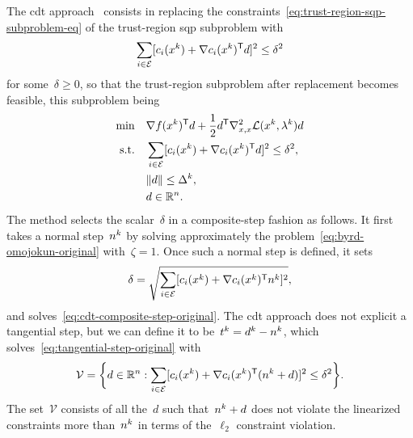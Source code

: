 The \gls{cdt} approach~\cite{Celis_1985,Celis_Dennis_Tapia_1985} consists in replacing the constraints~\cref{eq:trust-region-sqp-subproblem-eq} of the trust-region \gls{sqp} subproblem with
\begin{equation*}
    \sum_{i \in \ieq} [\con{i}(\iter[k]) + \nabla \con{i}(\iter[k])^{\T} \step]^2 \le \delta^2
\end{equation*}
for some~$\delta \ge 0$, so that the trust-region subproblem after replacement becomes feasible, this subproblem being
\begin{subequations}
    \label{eq:cdt-composite-step-original}
    \begin{align}
        \min        & \quad \nabla \obj(\iter[k])^{\T} \step + \frac{1}{2} \step^{\T} \nabla_{x, x}^2 \lag(\iter[k], \lm[k]) \step\\
        \text{s.t.} & \quad \sum_{i \in \ieq} [\con{i}(\iter[k]) + \nabla \con{i}(\iter[k])^{\T} \step]^2 \le \delta^2, \label{eq:cdt-composite-step-original-eq}\\
                    & \quad \norm{\step} \le \rad[k], \label{eq:cdt-composite-step-original-tr}\\
                    & \quad \step \in \R^n. \nonumber
    \end{align}
\end{subequations}
The method selects the scalar~$\delta$ in a composite-step fashion as follows.
It first takes a normal step~$\nstep[k]$ by solving approximately the problem~\cref{eq:byrd-omojokun-original} with~$\zeta = 1$.
Once such a normal step is defined, it sets
\begin{equation*}
    \delta = \sqrt{\sum_{i \in \ieq} [\con{i}(\iter[k]) + \nabla \con{i}(\iter[k])^{\T} \nstep[k]]^2},
\end{equation*}
and solves~\cref{eq:cdt-composite-step-original}.
The \gls{cdt} approach does not explicit a tangential step, but we can define it to be~$\tstep[k] = \step[k] - \nstep[k]$, which solves~\cref{eq:tangential-step-original} with
\begin{equation*}
    \mathcal{V} = \set[\bigg]{d \in \R^n : \sum_{i \in \ieq} [\con{i}(\iter[k]) + \nabla \con{i}(\iter[k])^{\T} (\nstep[k] + \step)]^2 \le \delta^2}.
\end{equation*}
The set~$\mathcal{V}$ consists of all the~$d$ such that~$\nstep[k] + d$ does not violate the linearized constraints more than~$\nstep[k]$ in terms of the~$\ell_2$ constraint violation.

